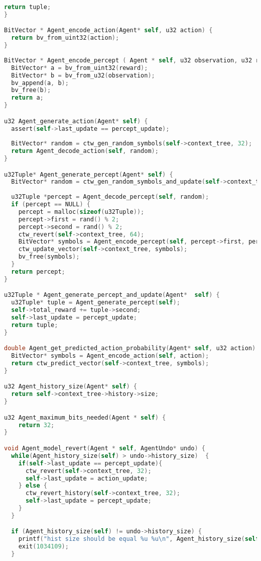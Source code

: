 \documentclass[fancychapters]{report}   	%
\begin{document}
\begin{lstlisting}[language=C,caption={agent.c}]
  return tuple;
}

BitVector * Agent_encode_action(Agent* self, u32 action) {
  return bv_from_uint32(action);
}
  
BitVector * Agent_encode_percept ( Agent * self, u32 observation, u32 reward) {
  BitVector* a = bv_from_uint32(reward);
  BitVector* b = bv_from_u32(observation);
  bv_append(a, b);
  bv_free(b);
  return a;
}

u32 Agent_generate_action(Agent* self) {
  assert(self->last_update == percept_update);
  
  BitVector* random = ctw_gen_random_symbols(self->context_tree, 32);
  return Agent_decode_action(self, random);
}

u32Tuple* Agent_generate_percept(Agent* self) {
  BitVector* random = ctw_gen_random_symbols_and_update(self->context_tree, 64);
  
  u32Tuple *percept = Agent_decode_percept(self, random);
  if (percept == NULL) {
    percept = malloc(sizeof(u32Tuple));
    percept->first = rand() % 2;
    percept->second = rand() % 2;
    ctw_revert(self->context_tree, 64);
    BitVector* symbols = Agent_encode_percept(self, percept->first, percept->second);
    ctw_update_vector(self->context_tree, symbols);
    bv_free(symbols);
  }
  return percept;
}

u32Tuple * Agent_generate_percept_and_update(Agent*  self) {
  u32Tuple* tuple = Agent_generate_percept(self);
  self->total_reward += tuple->second;
  self->last_update = percept_update;
  return tuple;
}

double Agent_get_predicted_action_probability(Agent* self, u32 action) {
  BitVector* symbols = Agent_encode_action(self, action);
  return ctw_predict_vector(self->context_tree, symbols);
}

u32 Agent_history_size(Agent* self) {
  return self->context_tree->history->size;
}

u32 Agent_maximum_bits_needed(Agent * self) {
    return 32;
}

void Agent_model_revert(Agent * self, AgentUndo* undo) {
  while(Agent_history_size(self) > undo->history_size)  {
    if(self->last_update == percept_update){
      ctw_revert(self->context_tree, 32);
      self->last_update = action_update;
    } else {
      ctw_revert_history(self->context_tree, 32);
      self->last_update = percept_update;
    }
  }

  if (Agent_history_size(self) != undo->history_size) {
    printf("hist size should be equal %u %u\n", Agent_history_size(self), undo->history_size);
    exit(1034109);
  }
  

\end{lstlisting}
\end{document}
